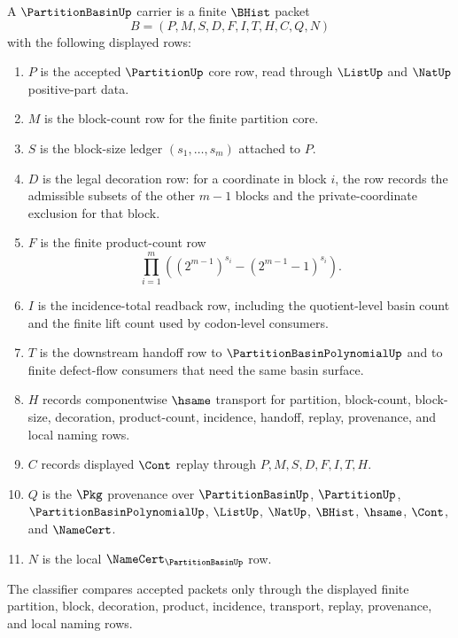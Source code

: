 \begin{definition}
\label{def:partition-basin-carrier}
A $\PartitionBasinUp$ carrier is a finite $\BHist$ packet
$$
B=(P,M,S,D,F,I,T,H,C,Q,N)
$$
with the following displayed rows:
\begin{enumerate}
\item $P$ is the accepted $\PartitionUp$ core row, read through $\ListUp$ and $\NatUp$ positive-part data.
\item $M$ is the block-count row for the finite partition core.
\item $S$ is the block-size ledger $(s_{1},\ldots,s_{m})$ attached to $P$.
\item $D$ is the legal decoration row: for a coordinate in block $i$, the row records the admissible subsets of the other $m-1$ blocks and the private-coordinate exclusion for that block.
\item $F$ is the finite product-count row
$$
\prod_{i=1}^{m}
\left(
(2^{m-1})^{s_{i}}
-
(2^{m-1}-1)^{s_{i}}
\right).
$$
\item $I$ is the incidence-total readback row, including the quotient-level basin count and the finite lift count used by codon-level consumers.
\item $T$ is the downstream handoff row to $\PartitionBasinPolynomialUp$ and to finite defect-flow consumers that need the same basin surface.
\item $H$ records componentwise $\hsame$ transport for partition, block-count, block-size, decoration, product-count, incidence, handoff, replay, provenance, and local naming rows.
\item $C$ records displayed $\Cont$ replay through $P,M,S,D,F,I,T,H$.
\item $Q$ is the $\Pkg$ provenance over $\PartitionBasinUp$, $\PartitionUp$, $\PartitionBasinPolynomialUp$, $\ListUp$, $\NatUp$, $\BHist$, $\hsame$, $\Cont$, and $\NameCert$.
\item $N$ is the local $\NameCert_{\PartitionBasinUp}$ row.
\end{enumerate}
The classifier compares accepted packets only through the displayed finite partition, block, decoration, product, incidence, transport, replay, provenance, and local naming rows.
\end{definition}

